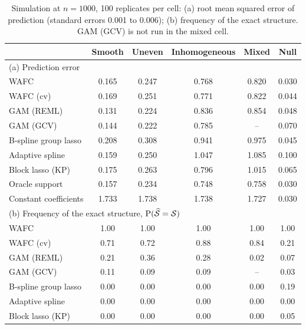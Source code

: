 \begin{table}[tp]
\caption{Simulation at $n = 1000$, 100 replicates per cell: (a) root mean
squared error of prediction (standard errors 0.001 to 0.006); (b) frequency
of the exact structure. GAM (GCV) is not run in the mixed cell.}
\label{tab:sim-main}
\centering
\small
\begin{tabular}{lccccc}
\hline
 & Smooth & Uneven & Inhomogeneous & Mixed & Null \\
\hline
\multicolumn{6}{l}{(a) Prediction error} \\
WAFC & 0.165 & 0.247 & 0.768 & 0.820 & 0.030 \\
WAFC (cv) & 0.169 & 0.251 & 0.771 & 0.822 & 0.044 \\
GAM (REML) & 0.131 & 0.224 & 0.836 & 0.854 & 0.048 \\
GAM (GCV) & 0.144 & 0.222 & 0.785 & -- & 0.070 \\
B-spline group lasso & 0.208 & 0.308 & 0.941 & 0.975 & 0.045 \\
Adaptive spline & 0.159 & 0.250 & 1.047 & 1.085 & 0.100 \\
Block lasso (KP) & 0.175 & 0.263 & 0.796 & 1.015 & 0.065 \\
Oracle support & 0.157 & 0.234 & 0.748 & 0.758 & 0.030 \\
Constant coefficients & 1.733 & 1.738 & 1.738 & 1.727 & 0.030 \\
\hline
\multicolumn{6}{l}{(b) Frequency of the exact structure, $\mathrm{P}(\widehat{\mathcal{S}} = \mathcal{S})$} \\
WAFC & 1.00 & 1.00 & 1.00 & 1.00 & 1.00 \\
WAFC (cv) & 0.71 & 0.72 & 0.88 & 0.84 & 0.21 \\
GAM (REML) & 0.21 & 0.36 & 0.28 & 0.02 & 0.07 \\
GAM (GCV) & 0.11 & 0.09 & 0.09 & -- & 0.03 \\
B-spline group lasso & 0.00 & 0.00 & 0.00 & 0.00 & 0.19 \\
Adaptive spline & 0.00 & 0.00 & 0.00 & 0.00 & 0.00 \\
Block lasso (KP) & 0.00 & 0.00 & 0.00 & 0.00 & 0.05 \\
\hline
\end{tabular}
\end{table}
